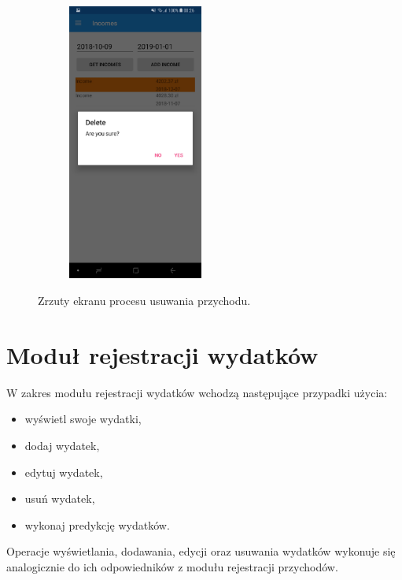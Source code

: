 \begin{figure}[!ht]
\begin{center}
\begin{subfigure}[b]{0.3\textwidth}
			\label{przychod_menu_usun}
		\end{subfigure}
		\begin{subfigure}[b]{0.3\textwidth}
			\includegraphics[width=1.75in]{img/mobile/usun_na_pewno.jpg}
			\label{usun_na_pewno}
		\end{subfigure}
	\end{center}
	\caption{Zrzuty ekranu procesu usuwania przychodu.}
\end{figure}


\section{Moduł rejestracji wydatków}
W zakres modułu rejestracji wydatków wchodzą następujące przypadki użycia:
\begin{itemize}
	\item wyświetl swoje wydatki,
	\item dodaj wydatek,
	\item edytuj wydatek,
	\item usuń wydatek,
	\item wykonaj predykcję wydatków.
\end{itemize}

Operacje wyświetlania, dodawania, edycji oraz usuwania wydatków wykonuje się analogicznie do ich odpowiedników z modułu rejestracji przychodów.


